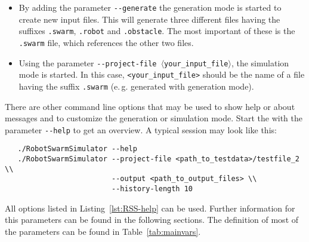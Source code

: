 \documentclass[a4paper,halfparskip,11pt,twoside]{scrartcl}
\begin{document}
\begin{itemize}
	\item By adding the parameter {\tt -{}-generate} the generation mode is started to create new input files. This will generate three different files having the suffixes {\tt .swarm}, {\tt .robot} and {\tt .obstacle}. The most important of these is the {\tt .swarm} file, which references the other two files.
	\item Using the parameter {\tt -{}-project-file $\langle$your\_input\_file$\rangle$}, the simulation mode is started. In this case, \texttt{<your\_input\_file>} should be the name of a file having the suffix {\tt .swarm} (e.\,g. generated with generation mode).
\end{itemize}

There are other command line options that may be used to show help or about messages and to customize the generation or simulation mode. Start the \RSS with the parameter {\tt -{}-help} to get an overview. A typical session may look like this:

\begin{verbatim}
   ./RobotSwarmSimulator --help
   ./RobotSwarmSimulator --project-file <path_to_testdata>/testfile_2 \\
                         --output <path_to_output_files> \\
                         --history-length 10
\end{verbatim}

All options listed in Listing~\ref{lst:RSS-help} can be used. Further information for this parameters can be found in the following sections. The definition of most of the parameters can be found in Table~\ref{tab:mainvars}.
\end{document}
